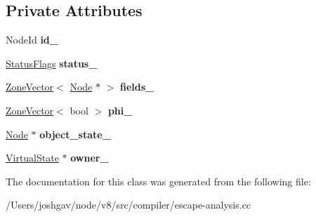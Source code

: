 \subsection*{Private Attributes}
\begin{DoxyCompactItemize}
\item 
Node\+Id {\bfseries id\+\_\+}\hypertarget{classv8_1_1internal_1_1compiler_1_1_virtual_object_af36a3dde71465a2fb9112e7d94734bc2}{}\label{classv8_1_1internal_1_1compiler_1_1_virtual_object_af36a3dde71465a2fb9112e7d94734bc2}

\item 
\hyperlink{classv8_1_1base_1_1_flags}{Status\+Flags} {\bfseries status\+\_\+}\hypertarget{classv8_1_1internal_1_1compiler_1_1_virtual_object_aba6e0921e0f0283437813188d31d43e4}{}\label{classv8_1_1internal_1_1compiler_1_1_virtual_object_aba6e0921e0f0283437813188d31d43e4}

\item 
\hyperlink{classv8_1_1internal_1_1_zone_vector}{Zone\+Vector}$<$ \hyperlink{classv8_1_1internal_1_1compiler_1_1_node}{Node} $\ast$ $>$ {\bfseries fields\+\_\+}\hypertarget{classv8_1_1internal_1_1compiler_1_1_virtual_object_a51c4973dbf11f3d7a2b64f93dd572680}{}\label{classv8_1_1internal_1_1compiler_1_1_virtual_object_a51c4973dbf11f3d7a2b64f93dd572680}

\item 
\hyperlink{classv8_1_1internal_1_1_zone_vector}{Zone\+Vector}$<$ bool $>$ {\bfseries phi\+\_\+}\hypertarget{classv8_1_1internal_1_1compiler_1_1_virtual_object_a89c97c3c11212810d2a0fc041442c57d}{}\label{classv8_1_1internal_1_1compiler_1_1_virtual_object_a89c97c3c11212810d2a0fc041442c57d}

\item 
\hyperlink{classv8_1_1internal_1_1compiler_1_1_node}{Node} $\ast$ {\bfseries object\+\_\+state\+\_\+}\hypertarget{classv8_1_1internal_1_1compiler_1_1_virtual_object_a4e860e620e316c3be533f8c210e2e559}{}\label{classv8_1_1internal_1_1compiler_1_1_virtual_object_a4e860e620e316c3be533f8c210e2e559}

\item 
\hyperlink{classv8_1_1internal_1_1compiler_1_1_virtual_state}{Virtual\+State} $\ast$ {\bfseries owner\+\_\+}\hypertarget{classv8_1_1internal_1_1compiler_1_1_virtual_object_afadc0338708750b066f12cf8d7398b67}{}\label{classv8_1_1internal_1_1compiler_1_1_virtual_object_afadc0338708750b066f12cf8d7398b67}

\end{DoxyCompactItemize}


The documentation for this class was generated from the following file\+:\begin{DoxyCompactItemize}
\item 
/\+Users/joshgav/node/v8/src/compiler/escape-\/analysis.\+cc\end{DoxyCompactItemize}
